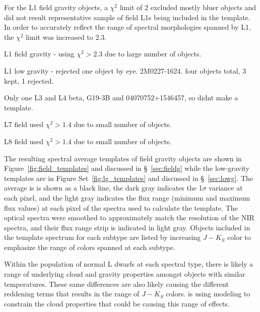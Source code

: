 \documentclass[12pt,preprint]{aastex}
\begin{document}
For the L1 field gravity objects, a $\chi^2$ limit of 2 excluded mostly bluer objects and did not result representative sample of field L1s being included in the template.
In order to accurately reflect the range of spectral morphologies spanned by L1, the $\chi^2$ limit was increased to 2.3.

L1 field gravity - using $\chi^2 > 2.3$ due to large number of objects.

L1 low gravity - rejected one object by eye. 2M0227-1624. four objects total, 3 kept, 1 rejected. 

Only one L3 and L4 beta, G19-3B and 04070752+1546457, so didnt make a template.

L7 field used $\chi^2 > 1.4$ due to small number of objects.

L8 field used $\chi^2 > 1.4$ due to small number of objects.


The resulting spectral average templates of field gravity objects are shown in Figure~\ref{fig:field_templates} and discussed in \S~\ref{sec:fieldg} while the low-gravity templates are in Figure Set~\ref{fig:lg_templates} and discussed in \S~\ref{sec:lowg}. 
The average is is shown as a black line, the dark gray indicates the 1$\sigma$ variance at each pixel, and the light gray indicates the flux range (minimum and maximum flux values) at each pixel of the spectra used to calculate the template. 
The optical spectra were smoothed to approximately match the resolution of the NIR spectra, and their flux range strip is indicated in light gray.
Objects included in the template spectrum for each subtype are listed by increasing $J-K_S$ color to emphasize the range of colors spanned at each subtype.

Within the population of normal L dwarfs at each spectral type, there is likely a range of underlying cloud and gravity properties amongst objects with similar temperatures.
These same differences are also likely causing the different reddening terms that results in the range of $J-K_S$ colors. \citet{Hiranaka13,Marocco:2014kr} is using modeling to constrain the cloud properties that could be causing this range of effects.
\end{document}
